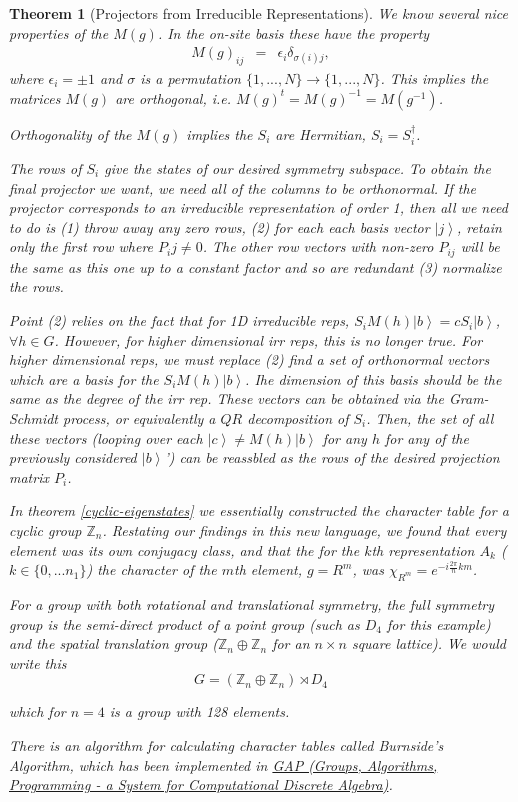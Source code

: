 \documentclass{article}
\newcommand{\ket}[1]{\left| #1 \right>} %
\newtheorem{theorem}{Theorem}[section]
\theoremstyle{definition}
\begin{document}
\begin{theorem}[Projectors from Irreducible Representations]
We know several nice properties of the $M(g)$. In the on-site basis these have the property
\begin{eqnarray}
M(g)_{ij} &=& \epsilon_i \delta_{\sigma(i) j},
\end{eqnarray}
where $\epsilon_i = \pm 1$ and $\sigma$ is a permutation $\{1, ..., N\} \to \{1, ..., N\}$. This implies the matrices $M(g)$ are orthogonal, i.e. $M(g)^t = M(g)^{-1} = M(g^{-1})$.

Orthogonality of the $M(g)$ implies the $S_i$ are Hermitian, $S_i = S_i^\dag$.

The rows of $S_i$ give the states of our desired symmetry subspace. To obtain the final projector we want, we need all of the columns to be orthonormal. If the projector corresponds to an irreducible representation of order 1, then all we need to do is (1) throw away any zero rows, (2) for each each basis vector $\ket{j}$, retain only the first row where $P_ij \neq 0$. The other row vectors with non-zero $P_{ij}$ will be the same as this one up to a constant factor and so are redundant (3) normalize the rows.

Point (2) relies on the fact that for 1D irreducible reps, $S_i M(h) \ket{b} = c S_i \ket{b}$, $\forall h \in G$. However, for higher dimensional irr reps, this is no longer true. For higher dimensional reps, we must replace (2) find a set of orthonormal vectors which are a basis for the $S_i M(h) \ket{b}$. Ihe dimension of this basis should be the same as the degree of the irr rep. These vectors can be obtained via the Gram-Schmidt process, or equivalently a $QR$ decomposition of $S_i$. Then, the set of all these vectors (looping over each $\ket{c} \neq M(h) \ket{b}$ for any $h$ for any of the previously considered $\ket{b}$') can be reassbled as the rows of the desired projection matrix $P_i$.

In theorem \ref{cyclic-eigenstates} we essentially constructed the character table for a cyclic group $\mathbb{Z}_n$. Restating our findings in this new language, we found that every element was its own conjugacy class, and that the for the $k$th representation $A_k$ ($k \in \{0,...n_1\}$) the character of the $m$th element, $g = R^m$, was $\chi_{R^m} = e^{-i \frac{2\pi}{n} km}$.

For a group with both rotational and translational symmetry, the full symmetry group is the semi-direct product of a point group (such as $D_4$ for this example) and the spatial translation group ($\mathbb{Z}_n \oplus \mathbb{Z}_n$ for an $n \times n$ square lattice). We would write this 
\begin{equation}
G = (\mathbb{Z}_n \oplus \mathbb{Z}_n) \rtimes D_4
\end{equation}

which for $n=4$ is a group with 128 elements.

There is an algorithm for calculating character tables called \emph{Burnside's Algorithm}, which has been implemented in \href{https://www.gap-system.org/}{GAP (Groups, Algorithms, Programming - a System for Computational Discrete Algebra)}.

\end{theorem}
\end{document}
